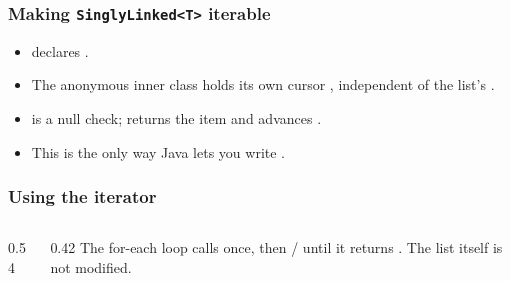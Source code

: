 \documentclass[aspectratio=169,10pt,compress]{beamer}
\begin{document}
\begin{frame}[t,fragile] \frametitle{Making \texttt{SinglyLinked<T>} iterable}
  \begin{itemize}\small
    \item {} declares .
    \item The anonymous inner class holds its own cursor ,
          independent of the list's .
    \item {} is a null check;  returns the
          item and advances .
    \item This is the only way Java lets you write
          .
  \end{itemize}
\end{frame}




\begin{frame}[t,fragile] \frametitle{Using the iterator}
  \begin{columns}[T]
    \begin{column}{0.54\textwidth}
    \end{column}
    \begin{column}{0.42\textwidth}
      \small
      The for-each loop calls  once, then
       /  until it returns .
      The list itself is not modified.
    \end{column}
  \end{columns}
\end{frame}

\end{document}
